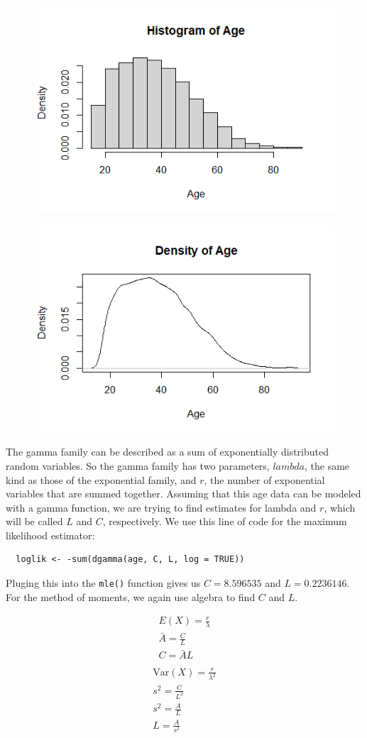 \documentclass[12pt, a4paper, oneside]{report}
\begin{document}
\begin{figure}[h]
  \centering
  \includegraphics[width=0.7\linewidth]{gammaHist.png}
\end{figure}

\begin{figure}[h]
  \centering
  \includegraphics[width=0.7\linewidth]{gammaDensity.png}
\end{figure}

The gamma family can be described as a sum of exponentially distributed random variables. So the gamma family has two parameters, \(lambda\), the same kind as those of the exponential family, and \(r\), the number of exponential variables that are summed together. Assuming that this age data can be modeled with a gamma function, we are trying to find estimates for lambda and \(r\), which will be called \(L\) and \(C\), respectively.
We use this line of code for the maximum likelihood estimator:
\begin{lstlisting}
  loglik <- -sum(dgamma(age, C, L, log = TRUE))
\end{lstlisting}
Pluging this into the \lstinline{mle()} function gives us \(C = 8.596535\) and \(L = 0.2236146\). 
For the method of moments, we again use algebra to find \(C\) and \(L\).

\begin{multicols}{2}
  \begin{align*}
  E(X) = \frac{r}{\lambda} \\
  \bar{A} = \frac{C}{L} \\
  C = \bar{A}L \\
  \end{align*}
\columnbreak
  \begin{align*}
  \text{Var}(X) = \frac{r}{\lambda^2} \\
  s^2 = \frac{C}{L^2} \\
  s^2 = \frac{A}{L} \\
  L = \frac{A}{s^2}
  \end{align*}
\end{multicols}
\end{document}

